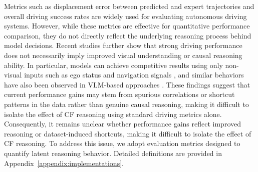 \documentclass{article}
\begin{document}
Metrics such as displacement error between predicted and expert trajectories \cite{dataset:nusc} and overall driving success rates \cite{dataset:navsim, dataset:bench2drive} are widely used for evaluating autonomous driving systems. However, while these metrics are effective for quantitative performance comparison, they do not directly reflect the underlying reasoning process behind model decisions. Recent studies further show that strong driving performance does not necessarily imply improved visual understanding or causal reasoning ability. In particular, models can achieve competitive results using only non-visual inputs such as ego status and navigation signals \cite{causal:e2e:ad-mlp, e2e-ad:is-ego-status}, and similar behaviors have also been observed in VLM-based approaches \cite{causal:e2e-vlm:omnidrive, causal:e2e-vlm:more_than_meets_the_eye}. These findings suggest that current performance gains may stem from spurious correlations or shortcut patterns in the data rather than genuine causal reasoning, making it difficult to isolate the effect of CF reasoning using standard driving metrics alone. Consequently, it remains unclear whether performance gains reflect improved reasoning or dataset-induced shortcuts, making it difficult to isolate the effect of CF reasoning. To address this issue, we adopt evaluation metrics designed to quantify latent reasoning behavior. Detailed definitions are provided in Appendix~\ref{appendix:implementations}.
\end{document}
